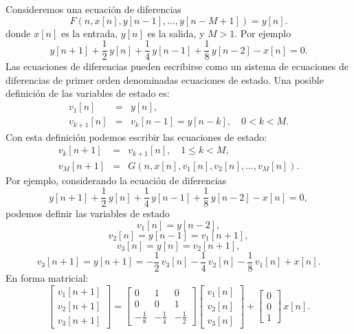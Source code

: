 \documentclass[11pt,a4paper,openany]{book}
\begin{document}
Consideremos una ecuación de diferencias
\begin{equation}
	F(n, x[n], y[n-1],..., y[n-M+1]) = y[n].
\end{equation}
donde $x[n]$ es la entrada, $y[n]$ es la salida, y $M > 1$. Por ejemplo
\begin{equation}
	y[n+1] + \frac{1}{2} \, y[n] + \frac{1}{4} \, y[n-1] + \frac{1}{8} \, y[n-2] - x[n] = 0.
\end{equation}
Las ecuaciones de diferencias pueden escribirse como un sistema de ecuaciones de diferencias de primer orden denominadas ecuaciones de estado. Una posible definición de las variables de estado es:
\begin{eqnarray}
	v_{1}[n]   &=& y[n],                                               \\
	v_{k+1}[n] &=& v_{k}[n-1] = y[n-k], \quad 0 < k < M .
\end{eqnarray}
Con esta definición podemos escribir las ecuaciones de estado:
\begin{eqnarray}
	v_{k}[n+1] &=& v_{k+1}[n], \quad 1 \leq k < M,  \\
	v_{M}[n+1] &=& G(n, x[n], v_{1}[n], v_{2}[n],...,v_{M}[n]).
\end{eqnarray}
Por ejemplo, considerando la ecuación de diferencias
\begin{equation}
	y[n+1] + \frac{1}{2} \, y[n] + \frac{1}{4} \, y[n-1] + \frac{1}{8} \, y[n-2] - x[n] = 0,
\end{equation}
podemos definir las variables de estado
\begin{equation}
	v_{1}[n] = y[n-2],
\end{equation}
\begin{equation}
	v_{2}[n] = y[n-1] = v_{1}[n+1],
\end{equation}
\begin{equation}
	v_{3}[n] = y[n] = v_{2}[n+1],
\end{equation}
\begin{equation}
	v_{3}[n+1] = y[n+1] = - \frac{1}{2} \, v_{3}[n] - \frac{1}{4} \, v_{2}[n] - \frac{1}{8} \, v_{1}[n] + x[n].
\end{equation}
En forma matricial:
\begin{equation}
	\begin{bmatrix}
		v_{1}[n+1] \\
		v_{2}[n+1] \\
		v_{3}[n+1]
	\end{bmatrix} 
	= \begin{bmatrix}
		0 & 1 & 0 \\
		0 & 0 & 1 \\
		-\frac{1}{8} & -\frac{1}{4} & -\frac{1}{2}
	\end{bmatrix} 
	\begin{bmatrix}
		v_{1}[n]\\
		v_{2}[n]\\
		v_{3}[n]
	\end{bmatrix}
	+
	\begin{bmatrix}
		0 \\
		0 \\
		1
	\end{bmatrix} \, x[n].
\end{equation}
\end{document}

